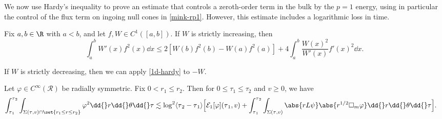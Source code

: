 \documentclass[10pt, reqno]{amsart}
\begin{document}
We now use Hardy's inequality to prove an estimate that controls a zeroth-order
term in the bulk by the \(p=1\) energy, using in particular the control of the
flux term on ingoing null cones in \cref{mink-rp1}. However, this estimate includes
a logarithmic loss in time.
\begin{lemma}
Fix \(a,b\in \R\) with \(a<b\), and let \(f,W\in C^1([a,b])\). If \(W\) is strictly
increasing, then
\begin{equation}\label{hardy-1}
\int_a^b W'(x)f^2(x)\dd{}x \le 2[W(b)f^2(b) - W(a)f^2(a)] + 4\int_a^b \frac{W(x)^2}{W'(x)}f'(x)^2\dd{}x.
\end{equation}
\label{1d-hardy}
\end{lemma}
\begin{remark}
If \(W\) is strictly decreasing, then we can apply \cref{1d-hardy} to \(-W\).
\label{hardy-negative}
\end{remark}
\begin{lemma}
Let \(\varphi{}\in C^\infty(\mathcal{R})\) be radially symmetric. Fix \(0<r_1\le r_2\). Then for \(0\le \tau_1\le
\tau_2\) and \(v\ge 0\), we have
\begin{equation}
\begin{split}
\int_{\tau{}_1}^{\tau{}_2} \int _{\Sigma{}(\tau{},v)\cap \set{r_1\le r\le r_2}} \varphi^2\dd{}r\dd{}\theta{}\dd{}\tau{} &\lesssim \log^2\langle{}\tau{}_2-\tau{}_1\rangle{}\Bigl[\mathcal{E}_1[\varphi{}](\tau{}_1,v) + \int_{\tau{}_1}^{\tau{}_2} \int _{\Sigma{}(\tau{},v)} \abs{rL\psi{}}\abs{r^{1/2}\Box{}_m\varphi{}}\dd{}r\dd{}\theta{}\dd{}\tau{}\Bigr].
\end{split}
\end{equation}
\label{preliminary-zo-control}
\end{lemma}
\end{document}
